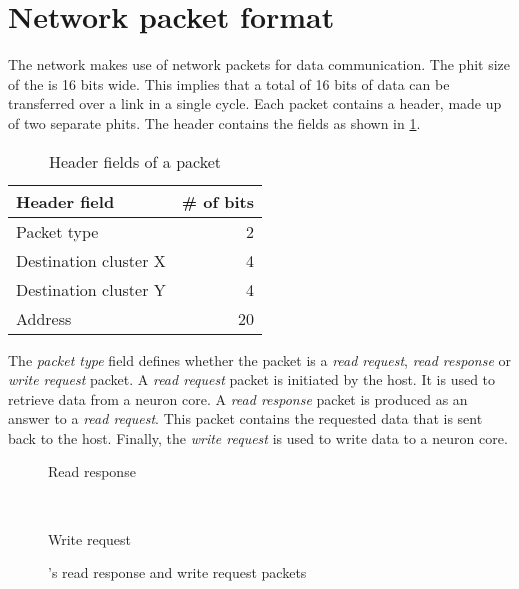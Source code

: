 \section{Network packet format}
The network makes use of network packets for data communication.
The phit size of the \confignoc{} is 16 bits wide.
This implies that a total of 16 bits of data can be transferred over a link in a single cycle.
Each packet contains a header, made up of two separate phits.
The header contains the fields as shown in \cref{tab:header_fields}.

\begin{table}[hbtp]
\centering
\begin{tabular}{@{}lr@{}}
\toprule
\textbf{Header field} & \textbf{\# of bits} \\ \midrule
Packet type           & 2                   \\
Destination cluster X & 4                   \\
Destination cluster Y & 4                   \\
Address               & 20                  \\ \bottomrule
\end{tabular}
\caption{Header fields of a \confignoc{} packet}
\label{tab:header_fields}
\end{table}

The \textit{packet type} field defines whether the packet is a \textit{read request}, \textit{read response} or \textit{write request} packet.
A \textit{read request} packet is initiated by the host.
It is used to retrieve data from a neuron core.
A \textit{read response} packet is produced as an answer to a \textit{read request}.
This packet contains the requested data that is sent back to the host.
Finally, the \textit{write request} is used to write data to a neuron core.

\hspace*{0.5em}
\begin{figure}[hbtp]
    \centering
    \begin{subcaptionblock}{\linewidth}
        \centering
        \begin{adjustbox}{width=0.7\linewidth}
            
        \end{adjustbox}
        \caption{Read response}
        \label{fig:read_response_packet}
    \end{subcaptionblock}
    \\ \vspace{1.5em}
    \begin{subcaptionblock}{\linewidth}
        \centering
        \begin{adjustbox}{width=0.7\linewidth}
            
        \end{adjustbox}
        \caption{Write request}
        \label{fig:write_request_packet}
    \end{subcaptionblock}
    \caption{\confignoc{}'s read response and write request packets}
\end{figure}

